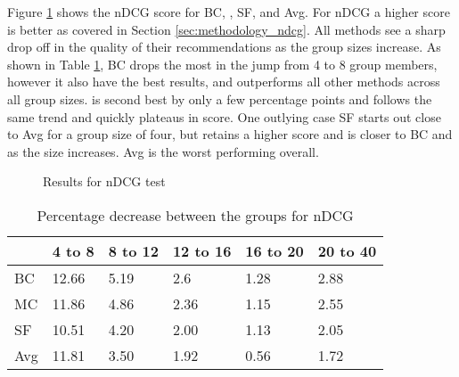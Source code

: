 Figure \ref{fig:ndcg} shows the nDCG score for BC, \MC, SF, and Avg. For nDCG a higher score is better as covered in Section \ref{sec:methodology_ndcg}.
All methods see a sharp drop off in the quality of their recommendations as the group sizes increase.
As shown in Table \ref{tbl:ndcg}, BC drops the most in the jump from 4 to 8 group members, however it also have the best results, and outperforms all other methods across all group sizes.
\MC is second best by only a few percentage points and follows the same trend and quickly plateaus in score.
One outlying case SF starts out close to Avg for a group size of four, but retains a higher score and is closer to BC and \MC as the size increases.
Avg is the worst performing overall.

\begin{figure}[H]
	\caption{Results for nDCG test}\label{fig:ndcg}
\end{figure}

\begin{table}[H]
	\centering
	\begin{tabular}{|l|lllll|}\hline
		& 4 to 8 & 8 to 12 & 12 to 16 & 16 to 20 & 20 to 40 \\\hline
		BC 	& 12.66	& 5.19	& 2.6	& 1.28	& 2.88 \\
		MC  & 11.86	& 4.86	& 2.36	& 1.15	& 2.55 \\
		SF  & 10.51	& 4.20	& 2.00	& 1.13	& 2.05 \\
		Avg	& 11.81	& 3.50 	& 1.92	& 0.56	& 1.72 \\ \hline
	\end{tabular}
	\caption{Percentage decrease between the groups for nDCG}
	\label{tbl:ndcg}
\end{table}

